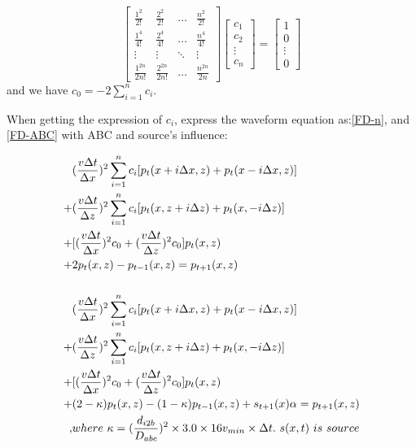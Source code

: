 \documentclass[a4paper]{article}
\begin{document}
		\begin{equation}
			\begin{bmatrix}
				\frac{1^2}{2!} & \frac{2^2}{2!} & \ldots & \frac{n^2}{2!}\\
				\frac{1^4}{4!} & \frac{2^4}{4!} & \ldots & \frac{n^4}{4!}\\
				\vdots & \vdots & \ddots & \vdots\\
				\frac{1^{2n}}{2n!} & \frac{2^{2n}}{2n!} & \ldots & \frac{n^{2n}}{2n}
			\end{bmatrix}
			\begin{bmatrix}
				 c_1\\c_2\\\vdots\\c_n
			\end{bmatrix}
			=
			\begin{bmatrix}
				 1\\0\\\vdots\\0
			\end{bmatrix}
			\label{n-order}
		\end{equation}
		 and we have $c_0=-2 \sum_{i=1}^{n}c_i$.

		When getting the expression of \textbf{$c_i$}, express the waveform equation as:\autoref{FD-n}, and \autoref{FD-ABC} with ABC and source's influence: \par
		\begin{align}
			&(\frac{v\Delta t}{\Delta x})^2\sum_{i=1}^n c_i[p_t(x+i\Delta x,z)+p_t(x-i\Delta x, z)] \notag\\
			+&(\frac{v\Delta t}{\Delta z})^2\sum_{i=1}^n c_i[p_t(x, z+i\Delta z)+p_t(x, -i\Delta z)] \notag\\
			+&[(\frac{v\Delta t}{\Delta x})^2c_0+(\frac{v\Delta t}{\Delta z})^2c_0]p_t(x,z)\notag\\
			+&2p_t(x,z)-p_{t-1}(x,z)=p_{t+1}(x,z)
			\label{FD-n}
			\\ \notag\\
			&(\frac{v\Delta t}{\Delta x})^2\sum_{i=1}^n c_i[p_t(x+i\Delta x,z)+p_t(x-i\Delta x, z)] \notag\\
			+&(\frac{v\Delta t}{\Delta z})^2\sum_{i=1}^n c_i[p_t(x, z+i\Delta z)+p_t(x, -i\Delta z)] \notag\\
			+&[(\frac{v\Delta t}{\Delta x})^2c_0+(\frac{v\Delta t}{\Delta z})^2c_0]p_t(x,z)\notag\\
			+&(2-\kappa)p_t(x,z)-(1-\kappa)p_{t-1}(x,z)+s_{t+1}(x)\alpha=p_{t+1}(x,z) \notag\\
			,&where\ \kappa=(\frac{d_{i2b}}{D_{abc}})^2\times 3.0 \times  16 v_{min}\times \Delta t.\ s(x,t)\ is\ source
			\label{FD-ABC}			
		\end{align}
\end{document}
